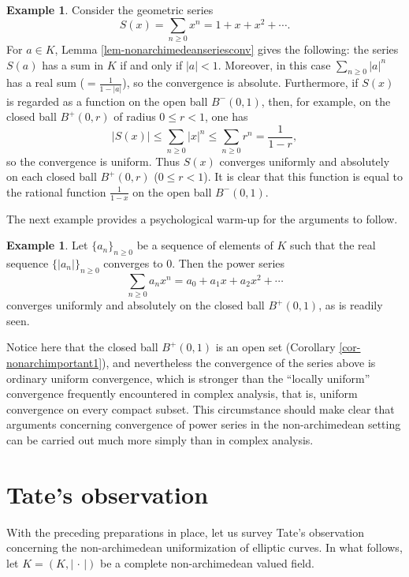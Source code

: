 \documentclass[a4paper,12pt, dvipdfmx]{jsbook}
\newcommand{\abs}[1]{\lvert#1\rvert}
\theoremstyle{plain}
\theoremstyle{definition}
\newtheorem{exa}[thm]{\bfseries Example}
\begin{document}
\begin{exa}\label{exa-geometricseries}{\rm 
Consider the geometric series
$$
S(x)=\sum_{n\geq 0}x^n=1+x+x^2+\cdots.
$$
For $a\in K$, Lemma \ref{lem-nonarchimedeanseriesconv} gives the following: the series $S(a)$ has a sum in $K$ if and only if $\abs{a}<1$.
Moreover, in this case $\sum_{n\geq 0}\abs{a}^n$ has a real sum ($=\frac{1}{1-\abs{a}}$), so the convergence is absolute.
Furthermore, if $S(x)$ is regarded as a function on the open ball $B^-(0,1)$, then, for example, on the closed ball $B^+(0,r)$ of radius $0\leq r<1$, one has
$$
\abs{S(x)}\leq\sum_{n\geq 0}\abs{x}^n\leq\sum_{n\geq 0}r^n=\frac{1}{1-r},
$$
so the convergence is uniform.
Thus $S(x)$ converges uniformly and absolutely on each closed ball $B^+(0,r)$ ($0\leq r<1$).
It is clear that this function is equal to the rational function $\frac{1}{1-x}$ on the open ball $B^-(0,1)$.}
\end{exa}

The next example provides a psychological warm-up for the arguments to follow.
\begin{exa}\label{exa-tatealgebraseries}{\rm 
Let $\{a_n\}_{n\geq 0}$ be a sequence of elements of $K$ such that the real sequence $\{\abs{a_n}\}_{n\geq 0}$ converges to $0$.
Then the power series
$$
\sum_{n\geq 0}a_nx^n=a_0+a_1x+a_2x^2+\cdots
$$
converges uniformly and absolutely on the closed ball $B^+(0,1)$, as is readily seen.}
\end{exa}

Notice here that the closed ball $B^+(0,1)$ is an open set (Corollary \ref{cor-nonarchimportant1}), and nevertheless the convergence of the series above is ordinary uniform convergence, which is stronger than the ``locally uniform'' convergence frequently encountered in complex analysis, that is, uniform convergence on every compact subset.
This circumstance should make clear that arguments concerning convergence of power series in the non-archimedean setting can be carried out much more simply than in complex analysis.

\section{Tate's observation}\label{sec-Tatesobservation}
\setcounter{equation}{0}
With the preceding preparations in place, let us survey Tate's observation concerning the non-archimedean uniformization of elliptic curves.
In what follows, let $K=(K,\abs{\,\cdot\,})$ be a complete non-archimedean valued field.
\end{document}

